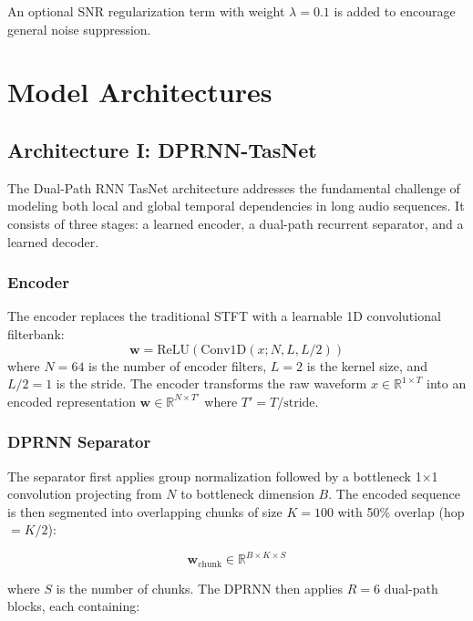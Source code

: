 \documentclass[conference]{IEEEtran}
\begin{document}
An optional SNR regularization term with weight $\lambda = 0.1$ is added to encourage general noise suppression.

\section{Model Architectures}
\label{sec:models}

\subsection{Architecture I: DPRNN-TasNet}
\label{sec:dprnn}

The Dual-Path RNN TasNet architecture addresses the fundamental challenge of modeling both local and global temporal dependencies in long audio sequences. It consists of three stages: a learned encoder, a dual-path recurrent separator, and a learned decoder.

\subsubsection{Encoder}

The encoder replaces the traditional STFT with a learnable 1D convolutional filterbank:
\begin{equation}
\mathbf{w} = \text{ReLU}(\text{Conv1D}(x; N, L, L/2))
\end{equation}
where $N = 64$ is the number of encoder filters, $L = 2$ is the kernel size, and $L/2 = 1$ is the stride. The encoder transforms the raw waveform $x \in \mathbb{R}^{1 \times T}$ into an encoded representation $\mathbf{w} \in \mathbb{R}^{N \times T'}$ where $T' = T/\text{stride}$.

\subsubsection{DPRNN Separator}

The separator first applies group normalization followed by a bottleneck 1$\times$1 convolution projecting from $N$ to bottleneck dimension $B$. The encoded sequence is then segmented into overlapping chunks of size $K = 100$ with 50\% overlap (hop $= K/2$):

\begin{equation}
\mathbf{w}_{\text{chunk}} \in \mathbb{R}^{B \times K \times S}
\end{equation}

where $S$ is the number of chunks. The DPRNN then applies $R = 6$ dual-path blocks, each containing:
\end{document}

